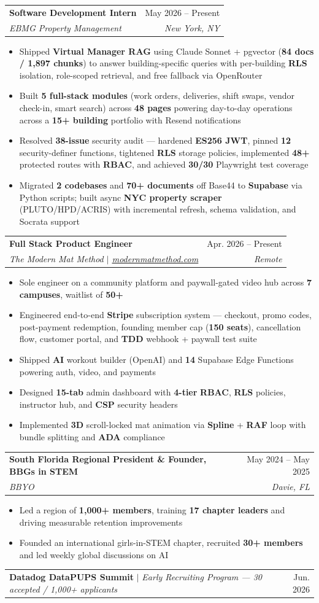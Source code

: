 \documentclass[letterpaper,11pt]{article}
\makeatletter
\newcommand{\resumeItem}[1]{
  \item\small{{#1 \vspace{-2pt}}}
}
\newcommand{\resumeSubheading}[4]{
  \vspace{-2pt}\item
    \begin{tabular*}{0.97\textwidth}[t]{l@{\extracolsep{\fill}}r}
      \textbf{#1} & #2 \\[-1pt]
      \textit{\small#3} & \textit{\small #4} \\
    \end{tabular*}\vspace{-7pt}
}
\newcommand{\resumeProjectHeading}[2]{
    \item
    \begin{tabular*}{0.97\textwidth}{l@{\extracolsep{\fill}}r}
      \small#1 & #2 \\
    \end{tabular*}\vspace{-4pt}
}
\newcommand{\resumeItemListStart}{\begin{itemize}[topsep=1pt]}
\newcommand{\resumeItemListEnd}{\end{itemize}\vspace{-5pt}}
\makeatother
\begin{document}
   \resumeSubheading
  {Software Development Intern}{May 2026 -- Present}
  {EBMG Property Management}{New York, NY}
  \resumeItemListStart
    \resumeItem{Shipped \textbf{Virtual Manager RAG} using Claude Sonnet + pgvector (\textbf{84 docs / 1,897 chunks}) to answer building-specific queries with per-building \textbf{RLS} isolation, role-scoped retrieval, and free fallback via OpenRouter}
\resumeItem{Built \textbf{5 full-stack modules} (work orders, deliveries, shift swaps, vendor check-in, smart search) across \textbf{48 pages} powering day-to-day operations across a \textbf{15+ building} portfolio with Resend notifications}
\resumeItem{Resolved \textbf{38-issue} security audit — hardened \textbf{ES256 JWT}, pinned \textbf{12} security-definer functions, tightened \textbf{RLS} storage policies, implemented \textbf{48+} protected routes with \textbf{RBAC}, and achieved \textbf{30/30} Playwright test coverage}
\resumeItem{Migrated \textbf{2 codebases} and \textbf{70+ documents} off Base44 to \textbf{Supabase} via Python scripts; built async \textbf{NYC property scraper} (PLUTO/HPD/ACRIS) with incremental refresh, schema validation, and Socrata support}
  \resumeItemListEnd
\vspace{3pt}
    \resumeSubheading
  {Full Stack Product Engineer}{Apr. 2026 -- Present}
  {The Modern Mat Method $|$ \href{https://modernmatmethod.com/}{\underline{modernmatmethod.com}}}{Remote}
  \resumeItemListStart
    \resumeItem{Sole engineer on a community platform and paywall-gated video hub across \textbf{7 campuses}, waitlist of \textbf{50+}}
\resumeItem{Engineered end-to-end \textbf{Stripe} subscription system — checkout, promo codes, post-payment redemption, founding member cap (\textbf{150 seats}), cancellation flow, customer portal, and \textbf{TDD} webhook + paywall test suite}
\resumeItem{Shipped \textbf{AI} workout builder (OpenAI) and \textbf{14} Supabase Edge Functions powering auth, video, and payments}
    \resumeItem{Designed \textbf{15-tab} admin dashboard with \textbf{4-tier} \textbf{RBAC}, \textbf{RLS} policies, instructor hub, and \textbf{CSP} security headers}
    \resumeItem{Implemented \textbf{3D} scroll-locked mat animation via \textbf{Spline} + \textbf{RAF} loop with bundle splitting and \textbf{ADA} compliance}
  \resumeItemListEnd
\vspace{3pt}
   \resumeSubheading
  {South Florida Regional President \& Founder, BBGs in STEM}{May 2024 -- May 2025}
  {BBYO}{Davie, FL}
  \resumeItemListStart
    \resumeItem{Led a region of \textbf{1,000+ members}, training \textbf{17 chapter leaders} and driving measurable retention improvements}
    \resumeItem{Founded an international girls-in-STEM chapter, recruited \textbf{30+ members} and led weekly global discussions on AI}
  \resumeItemListEnd
  \resumeProjectHeading
  {\textbf{Datadog DataPUPS Summit} $|$ \emph{Early Recruiting Program --- 30 accepted / 1,000+ applicants}}{Jun. 2026}
\end{document}
